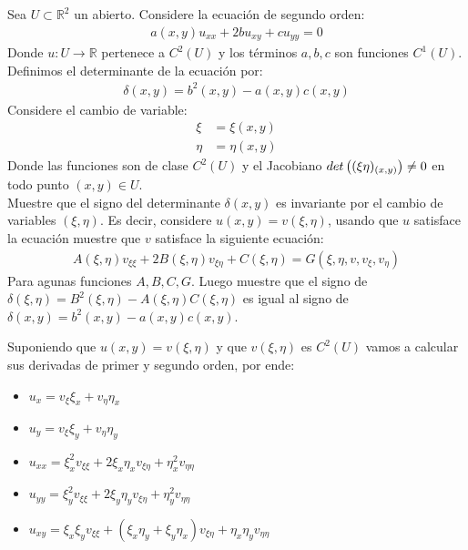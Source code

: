 \newpage

\begin{homeworkProblem}
Sea $U\subset \mathbb{R}^2$ un abierto. Considere la ecuación de segundo orden:
\begin{align*}
    a(x,y)u_{xx}+2bu_{xy}+cu_{yy}=0
\end{align*}
    Donde $u:U\rightarrow \mathbb{R}$ pertenece a $C^{2}(U)$ y los términos $a,b,c$ son funciones $C^{1}(U)$.\\
    Definimos el determinante de la ecuación por:
    \begin{align*}
        \delta(x,y)=b^2(x,y)-a(x,y)c(x,y)
    \end{align*}
    Considere el cambio de variable:
    \begin{align*}
        \xi&=\xi(x,y)\\
        \eta&=\eta(x,y)
    \end{align*}
    Donde las funciones son de clase $C^{2}(U)$ y el Jacobiano $det\left( (\xi\eta)_{(x,y)} \right)\neq 0$ en todo punto $(x,y)\in U$.\\
    Muestre que el signo del determinante $\delta(x,y)$ es invariante por el cambio de variables $(\xi,\eta)$. Es decir, considere $u(x,y)=v(\xi,\eta)$, usando que $u$ satisface la ecuación  muestre que $v$ satisface la siguiente ecuación:
    \begin{align*}
        A(\xi,\eta)v_{\xi\xi}+2B(\xi,\eta)v_{\xi\eta}+C(\xi,\eta)=G(\xi,\eta,v,v_{\xi},v_{\eta})
    \end{align*}
    Para agunas funciones $A,B,C,G$. Luego muestre que el signo de $\delta (\xi,\eta)=B^2(\xi,\eta)-A(\xi,\eta)C(\xi,\eta)$ es igual al signo de $\delta (x,y)=b^2(x,y)-a(x,y)c(x,y)$. 
\begin{solucion}
    Suponiendo que $u(x,y)=v(\xi,\eta)$ y que $v(\xi,\eta)$ es $C^{2}(U)$ vamos a calcular sus derivadas de primer y segundo orden, por ende:
    \begin{itemize}
        \item $u_{x}=v_{\xi}\xi_{x}+v_{\eta}\eta_{x}$
        \item $u_{y}=v_{\xi}\xi_{y}+v_{\eta}\eta_{y}$
        \item $u_{xx}=\xi_{x}^2v_{\xi\xi}+2\xi_{x}\eta_{x}v_{\xi\eta}+\eta_{x}^2v_{\eta\eta}$
        \item $u_{yy}=\xi_{y}^2v_{\xi\xi}+2\xi_{y}\eta_{y}v_{\xi\eta}+\eta_{y}^2v_{\eta\eta}$
        \item $u_{xy}=\xi_{x}\xi_{y}v_{\xi\xi}+(\xi_{x}\eta_{y}+\xi_{y}\eta_{x})v_{\xi\eta}+\eta_{x}\eta_{y}v_{\eta\eta}$

\end{itemize}
\end{solucion}
\end{homeworkProblem}
